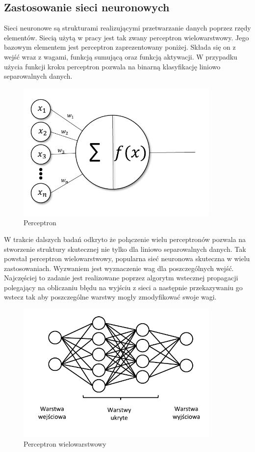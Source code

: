 \documentclass[12pt, a4paper, oneside]{article}
\begin{document}
	\subsection{Zastosowanie sieci neuronowych}
	Sieci neuronowe są strukturami realizującymi przetwarzanie danych poprzez rzędy elementów. Siecią użytą w pracy jest tak zwany perceptron wielowarstwowy. Jego bazowym elementem jest perceptron zaprezentowany poniżej. Składa się on z wejść wraz z wagami, funkcją sumującą oraz funkcją aktywacji. W przypadku użycia funkcji kroku perceptron pozwala na binarną klasyfikację liniowo separowalnych danych. 
	\begin{figure}[H]
		\centering
		\includegraphics[width=10cm]{images/perceptron_c.pdf}
		\caption{Perceptron}
	\end{figure}
	W trakcie dalszych badań odkryto że połączenie wielu perceptronów pozwala na stworzenie struktury skutecznej nie tylko dla liniowo separowalnych danych. Tak powstał perceptron wielowarstwowy, popularna sieć neuronowa skuteczna w wielu zastosowaniach. Wyzwaniem jest wyznaczenie wag dla poszczególnych wejść. Najczęściej to zadanie jest realizowane poprzez algorytm wstecznej propagacji polegający na obliczaniu błędu na wyjściu z sieci a następnie przekazywaniu go wstecz tak aby poszczególne warstwy mogły zmodyfikować swoje wagi. 
	\begin{figure}[H]
		\centering
		\includegraphics[width=10cm]{images/siec_c.pdf}
		\caption{Perceptron wielowarstwowy}
	\end{figure}
	
\end{document}
